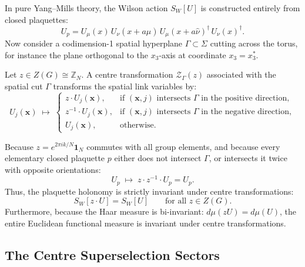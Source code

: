 In pure Yang--Mills theory, the Wilson action $S_W[U]$ is constructed entirely from closed plaquettes:
\begin{equation}
U_p = U_\mu(x) \, U_\nu(x+a\hat{\mu}) \, U_\mu(x+a\hat{\nu})^\dagger \, U_\nu(x)^\dagger.
\end{equation}
Now consider a codimension-1 spatial hyperplane $\Gamma \subset \Sigma$ cutting across the torus, for instance the plane orthogonal to the $x_3$-axis at coordinate $x_3 = x_3^*$. 

\begin{definition}
\label{def:centre_transformation}
Let $z \in Z(G) \cong \mathbb{Z}_N$. A centre transformation $\mathcal{Z}_\Gamma(z)$ associated with the spatial cut $\Gamma$ transforms the spatial link variables by:
\begin{equation}
\label{eq:centre_transformation_links}
U_j(\mathbf{x}) \;\longmapsto\; \begin{cases} z \cdot U_j(\mathbf{x}), & \text{if } (\mathbf{x}, j) \text{ intersects } \Gamma \text{ in the positive direction}, \\ z^{-1} \cdot U_j(\mathbf{x}), & \text{if } (\mathbf{x}, j) \text{ intersects } \Gamma \text{ in the negative direction}, \\ U_j(\mathbf{x}), & \text{otherwise}. \end{cases}
\end{equation}
\end{definition}

Because $z = e^{2\pi i k / N} \mathbf{1}_N$ commutes with all group elements, and because every elementary closed plaquette $p$ either does not intersect $\Gamma$, or intersects it twice with opposite orientations:
\begin{equation}
U_p \;\longmapsto\; z \cdot z^{-1} \cdot U_p = U_p.
\end{equation}
Thus, the plaquette holonomy is strictly invariant under centre transformations:
\begin{equation}
\label{eq:action_centre_invariance}
S_W[z \cdot U] = S_W[U] \qquad \text{for all } z \in Z(G).
\end{equation}
Furthermore, because the Haar measure is bi-invariant: $d\mu(z U) = d\mu(U)$, the entire Euclidean functional measure is invariant under centre transformations.

\subsection{The Centre Superselection Sectors}
\label{subsec:centre_superselection}

